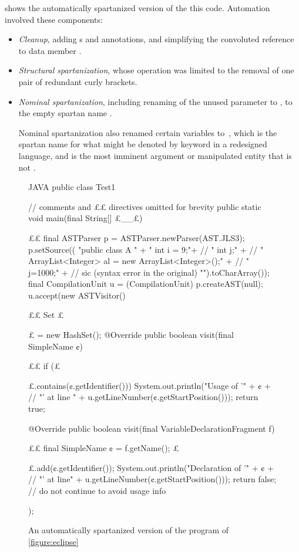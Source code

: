  shows the automatically spartanized version of
the this code. Automation involved these components: 
\begin{itemize}
  \item \emph{Cleanup}, adding s and  annotations, 
      and simplifying the convoluted reference to data member .
    \item \emph{Structural spartanization}, whose operation was limited  to the
      removal of one pair of redundant curly brackets.
    \item \emph{Nominal spartanization}, including renaming of the unused
      parameter  to , to the empty spartan name
      \cc{\_\_}.

      Nominal spartanization also renamed certain variables to~, which is
      the spartan name for what might be denoted by keyword  in a
      redesigned language, and is the most imminent argument or manipulated
      entity that is not . 
\end{itemize}
       

\begin{figure}
  \caption{An automatically spartanized version of
      the \Java program of \cref{figure:eclipse}}
    \label{figure:eclipse:automatic}
    \begin{adjustbox}{max width=\columnwidth}
\begin{code}[minipage, width=1.20\columnwidth]{JAVA}
public class Test1 { // comments and ££ directives omitted for brevity
  public static void main(final String[] £\_\_£) {££
    final ASTParser p = ASTParser.newParser(AST.JLS3);
    p.setSource((
      "public class A {\n" +
      " int i = 9;\n"+ //
      " int j;\n" + //
      " ArrayList<Integer> al = new ArrayList<Integer>();\n" + //
      " j=1000;\n" + // sic (syntax error in the original)
      "}\n").toCharArray());
    final CompilationUnit u = (CompilationUnit) p.createAST(null);
    u.accept(new ASTVisitor() {££
      Set £\ignore$£$ = new HashSet();
      @Override public boolean visit(final SimpleName ¢) {££
        if (£\ignore$£$.contains(¢.getIdentifier()))
          System.out.println("Usage of '" + ¢ + //
            "' at line " + u.getLineNumber(¢.getStartPosition()));
        return true;
      }
      @Override public boolean visit(final VariableDeclarationFragment f) {££
        final SimpleName ¢ = f.getName();
        £\ignore$£$.add(¢.getIdentifier());
        System.out.println("Declaration of '" + ¢ + //
          "' at line" + u.getLineNumber(¢.getStartPosition()));
        return false; // do not continue to avoid usage info
      }
    });
  }
}
\end{code}
  \end{adjustbox}
\end{figure}

